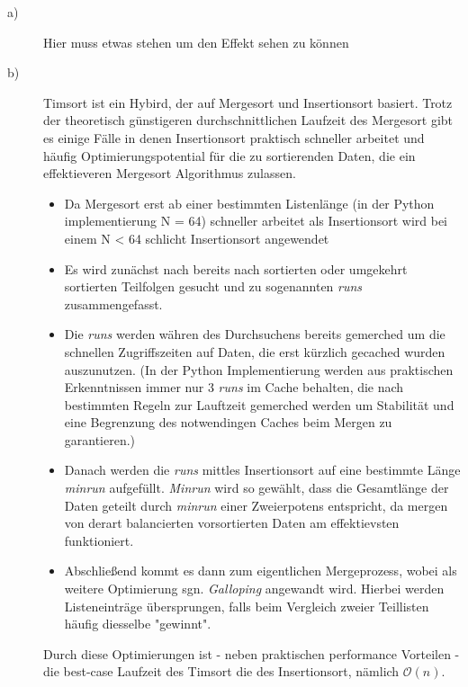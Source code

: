 \begin{description}
\item[a)]
Hier muss etwas stehen um den Effekt sehen zu k{\"o}nnen 
\item[b)]
Timsort ist ein Hybird, der auf Mergesort und Insertionsort basiert. Trotz der theoretisch günstigeren durchschnittlichen Laufzeit des Mergesort gibt es einige Fälle in denen Insertionsort praktisch schneller arbeitet und häufig Optimierungspotential für die zu sortierenden Daten, die ein effektieveren Mergesort Algorithmus zulassen.
\begin{itemize}
\item Da Mergesort erst ab einer bestimmten Listenlänge (in der Python implementierung N = 64) schneller arbeitet als Insertionsort wird bei einem N < 64 schlicht Insertionsort angewendet
\item Es wird zunächst nach bereits nach sortierten oder umgekehrt sortierten Teilfolgen gesucht und zu sogenannten \textit{runs} zusammengefasst.
\item Die \textit{runs} werden währen des Durchsuchens bereits gemerched um die schnellen Zugriffszeiten auf Daten, die erst kürzlich gecached wurden auszunutzen. (In der Python Implementierung werden aus praktischen Erkenntnissen immer nur 3 \textit{runs} im Cache behalten, die nach bestimmten Regeln zur Lauftzeit gemerched werden um Stabilität und eine Begrenzung des notwendingen Caches beim Mergen zu garantieren.)
\item Danach werden die \textit{runs} mittles Insertionsort auf eine bestimmte Länge \textit{minrun} aufgefüllt. \textit{Minrun} wird so gewählt, dass die Gesamtlänge der Daten geteilt durch \textit{minrun} einer Zweierpotens entspricht, da mergen von derart balancierten vorsortierten Daten am effektievsten funktioniert.
\item Abschließend kommt es dann zum eigentlichen Mergeprozess, wobei als weitere Optimierung sgn. \textit{Galloping} angewandt wird. Hierbei werden Listeneinträge übersprungen, falls beim Vergleich zweier Teillisten häufig diesselbe "gewinnt".
\end{itemize}
Durch diese Optimierungen ist - neben praktischen performance Vorteilen - die best-case Laufzeit des Timsort die des Insertionsort, nämlich ${\mathcal O (n)}$. 
\end{description}






